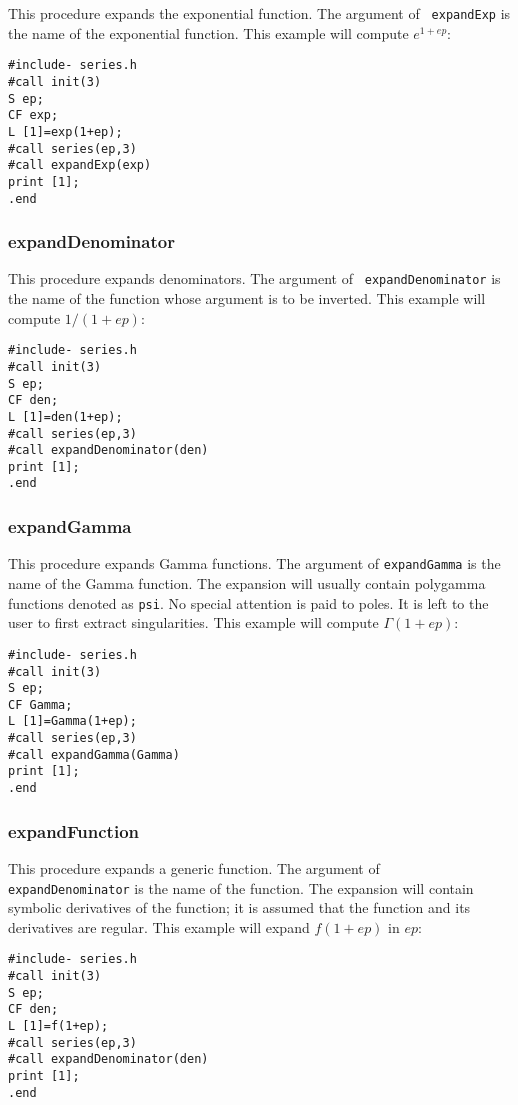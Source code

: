 \documentclass[titlepage]{article}
\begin{document}
This procedure expands the exponential function. The argument of {\tt
expandExp} is the name of the exponential function. This example will
compute $e^{1+ep}$:
\begin{verbatim}
#include- series.h
#call init(3)
S ep;
CF exp;
L [1]=exp(1+ep);
#call series(ep,3)
#call expandExp(exp)
print [1];
.end
\end{verbatim}

\subsubsection{expandDenominator}
\label{sec:inv_fun}

This procedure expands denominators. The argument of {\tt
expandDenominator} is the name of the function whose argument is to be
inverted. This example will compute $1/(1+ep)$:
\begin{verbatim}
#include- series.h
#call init(3)
S ep;
CF den;
L [1]=den(1+ep);
#call series(ep,3)
#call expandDenominator(den)
print [1];
.end
\end{verbatim}

\subsubsection{expandGamma}
\label{sec:exp_Gamma}

This procedure expands Gamma functions. The argument of {\tt expandGamma} is
the name of the Gamma function. The expansion will usually contain polygamma
functions denoted as {\tt psi}. No special attention is paid to
poles. It is left to the user to first extract singularities.
This example will compute $\Gamma(1+ep)$:
\begin{verbatim}
#include- series.h
#call init(3)
S ep;
CF Gamma;
L [1]=Gamma(1+ep);
#call series(ep,3)
#call expandGamma(Gamma)
print [1];
.end
\end{verbatim}

\subsubsection{expandFunction}
\label{sec:inv_fun}

This procedure expands a generic function. The argument of {\tt
expandDenominator} is the name of the function. The expansion will
contain symbolic derivatives of the function; it is assumed that the
function and its derivatives are regular.
This example will expand $f(1+ep)$ in $ep$:
\begin{verbatim}
#include- series.h
#call init(3)
S ep;
CF den;
L [1]=f(1+ep);
#call series(ep,3)
#call expandDenominator(den)
print [1];
.end
\end{verbatim}
\end{document}
